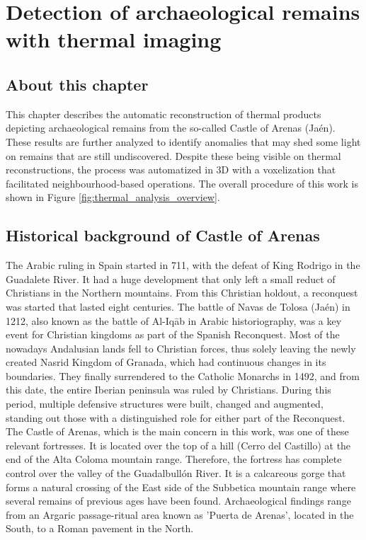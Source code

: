 \setchapterpreamble[u]{\margintoc}
\chapter{Detection of archaeological remains with thermal imaging}
\label{sec:castle_puerta_arenas}

\section*{About this chapter}

This chapter describes the automatic reconstruction of thermal products depicting archaeological remains from the so-called Castle of Arenas (Jaén). These results are further analyzed to identify anomalies that may shed some light on remains that are still undiscovered. Despite these being visible on thermal reconstructions, the process was automatized in 3D with a voxelization that facilitated neighbourhood-based operations. The overall procedure of this work is shown in Figure \ref{fig:thermal_analysis_overview}.

\section{Historical background of Castle of Arenas}

The Arabic ruling in Spain started in 711, with the defeat of King Rodrigo in the Guadalete River. It had a huge development that only left a small reduct of Christians in the Northern mountains. From this Christian holdout, a reconquest was started that lasted eight centuries. The battle of Navas de Tolosa (Jaén) in 1212, also known as the battle of Al-Iqāb in Arabic historiography, was a key event for Christian kingdoms as part of the Spanish Reconquest. Most of the nowadays Andalusian lands fell to Christian forces, thus solely leaving the newly created Nasrid Kingdom of Granada, which had continuous changes in its boundaries. They finally surrendered to the Catholic Monarchs in 1492, and from this date, the entire Iberian peninsula was ruled by Christians. During this period, multiple defensive structures were built, changed and augmented, standing out those with a distinguished role for either part of the Reconquest. The Castle of Arenas, which is the main concern in this work, was one of these relevant fortresses. It is located over the top of a hill (Cerro del Castillo) at the end of the Alta Coloma mountain range. Therefore, the fortress has complete control over the valley of the Guadalbullón River. It is a calcareous gorge that forms a natural crossing of the East side of the Subbetica mountain range where several remains of previous ages have been found. Archaeological findings range from an Argaric passage-ritual area known as 'Puerta de Arenas', located in the South, to a Roman pavement in the North.


